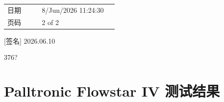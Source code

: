 \documentclass[UTF8,10pt,a4paper,fontset=fandol]{ctexart}
\newcommand{\fieldvalue}[1]{#1}
\newcommand{\handwritten}[1]{#1}
\begin{document}
\begin{small}
\begin{tabular}{@{}p{0.28\linewidth}p{0.62\linewidth}@{}}
日期 &
\fieldvalue{8/Jun/2026 11:24:30} \\

页码 &
\fieldvalue{2 of 2} \\
\end{tabular}
\end{small}

\begin{center}
\end{center}

\handwritten{[签名] 2026.06.10}

\handwritten{376?}

\newpage

\section*{Palltronic Flowstar IV 测试结果}
\end{document}
